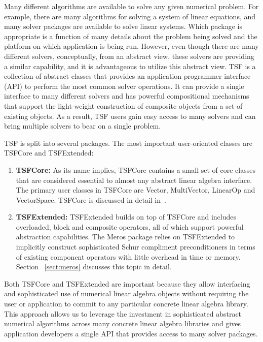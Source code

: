 \documentclass[acmtoms,acmnow]{acmtrans2m}
\begin{document}
Many different algorithms are available to solve any given numerical
problem.  For example, there are many algorithms for solving a system
of linear equations, and many solver packages are available to solve
linear systems.  Which package is appropriate is a function of
many details about the problem being solved and the platform on which
application is being run. However, even though
there are many different solvers, conceptually, from an abstract view,
these solvers are providing a similar capability, and it is
advantageous to utilize this abstract view.
TSF is a collection of abstract classes that provides an application
programmer interface (API) to perform the most common solver
operations.  It can provide a single interface to many different
solvers and has powerful compositional mechanisms that support the
light-weight construction of composite objects from a set of
existing objects.  As a result, TSF users gain easy access to many
solvers and can bring multiple solvers to bear on a single problem.

TSF is split into several packages.  The most important user-oriented
classes are TSFCore and TSFExtended:
\begin{enumerate}
\item {\bf TSFCore:} As its name implies, TSFCore contains a small set
of core classes that are considered essential to almost any abstract
linear algebra interface.  The primary user classes in TSFCore are
Vector, MultiVector, LinearOp and VectorSpace. TSFCore is discussed in
detail in~\cite{TSFCore}.
\item {\bf TSFExtended:} TSFExtended builds on top of TSFCore and
includes overloaded, block and composite operators, all of
which support powerful abstraction capabilities.  The Meros package
relies on TSFExtended to implicitly construct sophisticated
Schur compliment preconditioners in terms of existing component
operators with little overhead in time or memory.  Section
~\ref{sect:meros} discusses this topic in detail.
\end{enumerate}

Both TSFCore and TSFExtended are important because they allow
interfacing and sophisticated use of numerical linear algebra objects
without requiring the user or application to commit to any particular
concrete linear algebra library.  This approach allows us to leverage
the investment in sophisticated abstract numerical algorithms across
many concrete linear algebra libraries and gives application
developers a single API that provides access to many solver packages.
\end{document}
